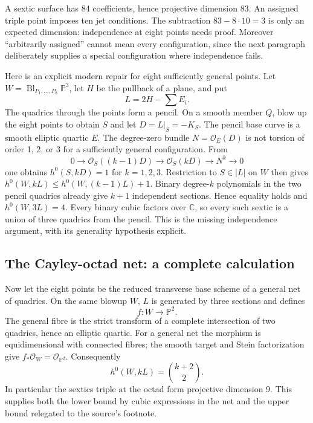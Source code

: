 A sextic surface has 84 coefficients, hence projective dimension 83. An assigned triple point imposes ten jet conditions. The subtraction \(83-8\cdot10=3\) is only an expected dimension: independence at eight points needs proof. Moreover ``arbitrarily assigned'' cannot mean every configuration, since the next paragraph deliberately supplies a special configuration where independence fails.

Here is an explicit modern repair for eight sufficiently general points. Let \(W=\operatorname{Bl}_{P_1,\ldots,P_8}\mathbb P^3\), let \(H\) be the pullback of a plane, and put \[
 L=2H-\sum E_i.
\] The quadrics through the points form a pencil. On a smooth member \(Q\), blow up the eight points to obtain \(S\) and let \(D=L|_S=-K_S\). The pencil base curve is a smooth elliptic quartic \(E\). The degree-zero bundle \(N=\mathcal O_E(D)\) is not torsion of order 1, 2, or 3 for a sufficiently general configuration. From \[
 0\longrightarrow\mathcal O_S((k-1)D)
 \longrightarrow\mathcal O_S(kD)\longrightarrow N^k\longrightarrow0
\] one obtains \(h^0(S,kD)=1\) for \(k=1,2,3\). Restriction to \(S\in|L|\) on \(W\) then gives \(h^0(W,kL)\leq h^0(W,(k-1)L)+1\). Binary degree-\(k\) polynomials in the two pencil quadrics already give \(k+1\) independent sections. Hence equality holds and \(h^0(W,3L)=4\). Every binary cubic factors over \(\mathbb C\), so every such sextic is a union of three quadrics from the pencil. This is the missing independence argument, with its generality hypothesis explicit.

\subsection{The Cayley-octad net: a complete calculation}

Now let the eight points be the reduced transverse base scheme of a general net of quadrics. On the same blowup \(W\), \(L\) is generated by three sections and defines \[
 f:W\longrightarrow\mathbb P^2.
\] The general fibre is the strict transform of a complete intersection of two quadrics, hence an elliptic quartic. For a general net the morphism is equidimensional with connected fibres; the smooth target and Stein factorization give \(f_*\mathcal O_W=\mathcal O_{\mathbb P^2}\). Consequently \[
 h^0(W,kL)=\binom{k+2}{2}.
\] In particular the sextics triple at the octad form projective dimension 9. This supplies both the lower bound by cubic expressions in the net and the upper bound relegated to the source's footnote.

